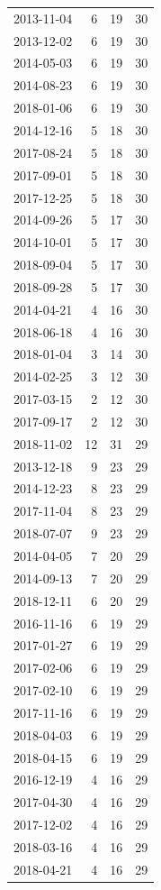 \begin{tabular}{lrrr}
2013-11-04 & 6 & 19 & 30 \\
2013-12-02 & 6 & 19 & 30 \\
2014-05-03 & 6 & 19 & 30 \\
2014-08-23 & 6 & 19 & 30 \\
2018-01-06 & 6 & 19 & 30 \\
2014-12-16 & 5 & 18 & 30 \\
2017-08-24 & 5 & 18 & 30 \\
2017-09-01 & 5 & 18 & 30 \\
2017-12-25 & 5 & 18 & 30 \\
2014-09-26 & 5 & 17 & 30 \\
2014-10-01 & 5 & 17 & 30 \\
2018-09-04 & 5 & 17 & 30 \\
2018-09-28 & 5 & 17 & 30 \\
2014-04-21 & 4 & 16 & 30 \\
2018-06-18 & 4 & 16 & 30 \\
2018-01-04 & 3 & 14 & 30 \\
2014-02-25 & 3 & 12 & 30 \\
2017-03-15 & 2 & 12 & 30 \\
2017-09-17 & 2 & 12 & 30 \\
2018-11-02 & 12 & 31 & 29 \\
2013-12-18 & 9 & 23 & 29 \\
2014-12-23 & 8 & 23 & 29 \\
2017-11-04 & 8 & 23 & 29 \\
2018-07-07 & 9 & 23 & 29 \\
2014-04-05 & 7 & 20 & 29 \\
2014-09-13 & 7 & 20 & 29 \\
2018-12-11 & 6 & 20 & 29 \\
2016-11-16 & 6 & 19 & 29 \\
2017-01-27 & 6 & 19 & 29 \\
2017-02-06 & 6 & 19 & 29 \\
2017-02-10 & 6 & 19 & 29 \\
2017-11-16 & 6 & 19 & 29 \\
2018-04-03 & 6 & 19 & 29 \\
2018-04-15 & 6 & 19 & 29 \\
2016-12-19 & 4 & 16 & 29 \\
2017-04-30 & 4 & 16 & 29 \\
2017-12-02 & 4 & 16 & 29 \\
2018-03-16 & 4 & 16 & 29 \\
2018-04-21 & 4 & 16 & 29 \\

\end{tabular}
